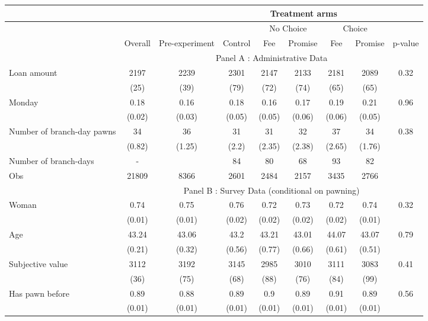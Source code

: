 \begin{tabular}{lcccccccc}
\toprule
      &       &       & \multicolumn{5}{c}{Treatment arms}    &  \\
\midrule
      &       &       &       & \multicolumn{2}{c}{No Choice } & \multicolumn{2}{c}{Choice} &  \\
\midrule
\midrule
      & Overall & Pre-experiment & Control & Fee   & Promise & Fee   & Promise & p-value \\
\midrule
      & \multicolumn{8}{c}{Panel A : Administrative Data} \\
\midrule
\midrule
Loan amount  & 2197  & 2239  & 2301  & 2147  & 2133  & 2181  & 2089  & 0.32 \\
      & (25)  & (39)  & (79)  & (72)  & (74)  & (65)  & (65)  &  \\
Monday & 0.18  & 0.16  & 0.18  & 0.16  & 0.17  & 0.19  & 0.21  & 0.96 \\
      & (0.02) & (0.03) & (0.05) & (0.05) & (0.06) & (0.06) & (0.05) &  \\
Number of branch-day pawns & 34    & 36    & 31    & 31    & 32    & 37    & 34    & 0.38 \\
      & (0.82) & (1.25) & (2.2) & (2.35) & (2.38) & (2.65) & (1.76) &  \\
\midrule
Number of branch-days & -     &       & 84    & 80    & 68    & 93    & 82    &  \\
Obs   & 21809 & 8366  & 2601  & 2484  & 2157  & 3435  & 2766  &  \\
\midrule
      & \multicolumn{8}{c}{Panel B : Survey Data (conditional on pawning)} \\
\midrule
\midrule
Woman & 0.74  & 0.75  & 0.76  & 0.72  & 0.73  & 0.72  & 0.74  & 0.32 \\
      & (0.01) & (0.01) & (0.02) & (0.02) & (0.02) & (0.02) & (0.01) &  \\
Age   & 43.24 & 43.06 & 43.2  & 43.21 & 43.01 & 44.07 & 43.07 & 0.79 \\
      & (0.21) & (0.32) & (0.56) & (0.77) & (0.66) & (0.61) & (0.51) &  \\
Subjective value & 3112  & 3192  & 3145  & 2985  & 3010  & 3111  & 3083  & 0.41 \\
      & (36)  & (75)  & (68)  & (88)  & (76)  & (84)  & (99)  &  \\
Has pawn before & 0.89  & 0.88  & 0.89  & 0.9   & 0.89  & 0.91  & 0.89  & 0.56 \\
      & (0.01) & (0.01) & (0.01) & (0.01) & (0.01) & (0.01) & (0.01) &  \\

\end{tabular}
